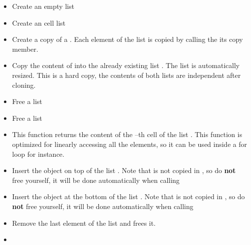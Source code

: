 \begin{itemize}
\item {}
  \sshortdescribe Create an empty list
\item {}
  \sshortdescribe Create an cell list
\item {}
  \sshortdescribe Create a copy of a . Each element of the
  list  is copied by calling the its copy member.
\item {}
  \sshortdescribe Copy the content of  into the already existing
  list . The list  is automatically resized. This is a
  hard copy, the contents of both lists are independent after cloning.
\item {}
  \sshortdescribe Free a list
\item {}
  \sshortdescribe Free a list
\item {}
  \sshortdescribe This function returns the content of the --th cell of
  the list . This function is optimized for linearly accessing all the
  elements, so it can be used inside a for loop for instance.
\item {}
  \sshortdescribe Insert the object  on top of the list . Note that
   is not copied in , so do  {\bf not} free  yourself, it
  will be done automatically when calling 
\item {}
  \sshortdescribe Insert the object  at the bottom of the list . Note that
   is not copied in , so do  {\bf not} free  yourself, it
  will be done automatically when calling 
\item {}
  \sshortdescribe Remove the last element of the list  and frees it.
\item {}

\end{itemize}

